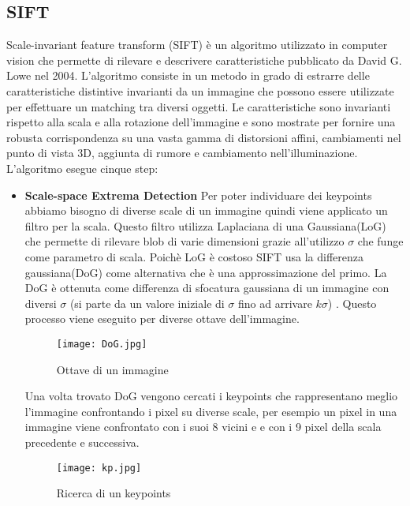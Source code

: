 \subsection{SIFT}
Scale-invariant feature transform (SIFT) è un algoritmo utilizzato in computer vision che permette di rilevare e descrivere caratteristiche pubblicato da David G. Lowe\cite{lowe04} nel 2004.
L'algoritmo consiste in un metodo in grado di estrarre delle caratteristiche distintive invarianti da un immagine che possono essere utilizzate per effettuare un matching tra diversi oggetti. Le caratteristiche sono invarianti rispetto alla scala e alla rotazione dell'immagine e sono mostrate per fornire una robusta corrispondenza su una vasta gamma di distorsioni affini, cambiamenti nel punto di vista 3D, aggiunta di rumore e cambiamento nell'illuminazione. L'algoritmo esegue cinque step:
\begin{itemize}
\item \textbf{Scale-space Extrema Detection}
Per poter individuare dei keypoints abbiamo bisogno di diverse scale di un immagine quindi viene applicato un filtro per la scala. Questo filtro utilizza Laplaciana di una Gaussiana(LoG) che permette di rilevare blob di varie dimensioni grazie all'utilizzo $\sigma$ che funge come parametro di scala. Poichè LoG è costoso SIFT usa la differenza gaussiana(DoG) come alternativa che è una approssimazione del primo. La DoG è ottenuta come differenza di sfocatura gaussiana di un immagine con diversi $\sigma$ (si parte da un valore iniziale di $\sigma$ fino ad arrivare $k\sigma$) . Questo processo viene eseguito per diverse ottave dell'immagine.

\begin{figure}[!h]
	\begin{center}
    \texttt{[image: DoG.jpg]}
    \caption{Ottave di un immagine}
    \label{fig:DoG}
    	\end{center}
\end{figure}

Una volta trovato DoG vengono cercati i keypoints che rappresentano meglio l'immagine confrontando i pixel su diverse scale, per esempio un pixel in una immagine viene confrontato con i suoi 8 vicini e e con i 9 pixel della scala precedente e successiva.

\begin{figure}[!h]
  \begin{center}
    \texttt{[image: kp.jpg]}
    \caption{Ricerca di un keypoints}
    \label{fig:kp}
    	\end{center}
\end{figure}


\end{itemize}
